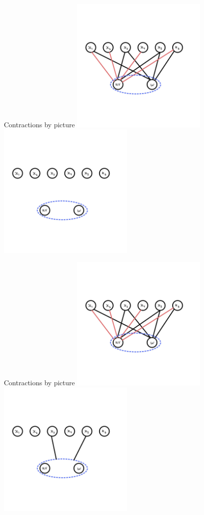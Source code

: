 \documentclass[aspectratio=169]{beamer}
\begin{document}
\begin{frame}{Contractions by picture}
    \includegraphics[width=0.5\textwidth]{images/cropped-08.jpg}%
    \includegraphics[width=0.5\textwidth]{images/cropped-09.jpg}
\end{frame}

\begin{frame}{Contractions by picture}
    \includegraphics[width=0.5\textwidth]{images/cropped-08.jpg}%
    \includegraphics[width=0.5\textwidth]{images/cropped-10.jpg}
\end{frame}
\end{document}
